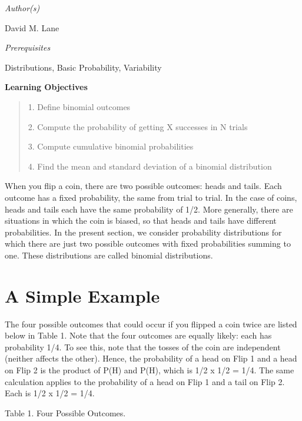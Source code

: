 \documentclass{book}
\begin{document}
\emph{Author(s)}

David M. Lane

\emph{Prerequisites}

Distributions, Basic Probability, Variability

\textbf{Learning Objectives}

\begin{quote}
1. Define binomial outcomes

2. Compute the probability of getting X successes in N trials

3. Compute cumulative binomial probabilities

4. Find the mean and standard deviation of a binomial distribution
\end{quote}

When you flip a coin, there are two possible outcomes: heads and tails. Each
outcome has a fixed probability, the same from trial to trial. In the case of
coins, heads and tails each have the same probability of 1/2. More generally,
there are situations in which the coin is biased, so that heads and tails have
different probabilities. In the present section, we consider probability
distributions for which there are just two possible outcomes with fixed
probabilities summing to one. These distributions are called binomial
distributions.

\hypertarget{a-simple-example}{%
\section{A Simple Example}\label{a-simple-example}}

The four possible outcomes that could occur if you flipped a coin twice are
listed below in Table 1. Note that the four outcomes are equally likely: each
has probability 1/4. To see this, note that the tosses of the coin are
independent (neither affects the other). Hence, the probability of a head on
Flip 1 and a head on Flip 2 is the product of P(H) and P(H), which is 1/2 x
1/2 = 1/4. The same calculation applies to the probability of a head on Flip 1
and a tail on Flip 2. Each is 1/2 x 1/2 = 1/4.

Table 1. Four Possible Outcomes.
\end{document}
